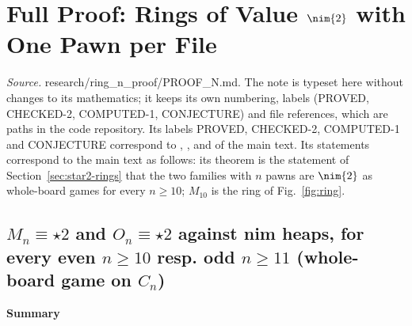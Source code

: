 \section{Full Proof: Rings of Value \texorpdfstring{$\nim{2}$}{*2} with One Pawn per File}\label{S-ringn}
\noindent\emph{Source.} research/ring\_n\_proof/PROOF\_N.md. The note is typeset here without changes to its mathematics; it keeps its own numbering, labels (PROVED, CHECKED-2, COMPUTED-1, CONJECTURE) and file references, which are paths in the code repository. Its labels PROVED, CHECKED-2, COMPUTED-1 and CONJECTURE correspond to , ,  and  of the main text. Its statements correspond to the main text as follows: its theorem is the statement of Section~\ref{sec:star2-rings} that the two families with $n$ pawns are $\nim{2}$ as whole-board games for every $n\ge10$; $M_{10}$ is the ring of Fig.~\ref{fig:ring}.


\subsection*{$M_n\equiv\star2$ and $O_n\equiv\star2$ against nim heaps, for every even $n\ge 10$ resp. odd $n\ge 11$ (whole-board game on $C_n$)}
\textbf{Summary}

